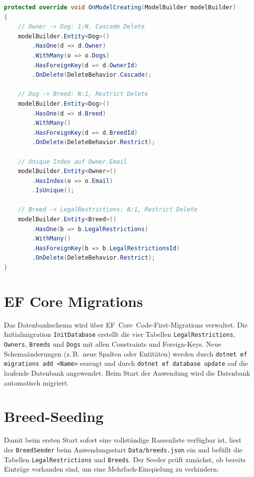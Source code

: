 \begin{lstlisting}[language=csharp, caption={DoggoContext.cs – Beziehungskonfiguration (Auszug)}, label=lst:context, float=htbp]
protected override void OnModelCreating(ModelBuilder modelBuilder)
{
    // Owner -> Dog: 1:N, Cascade Delete
    modelBuilder.Entity<Dog>()
        .HasOne(d => d.Owner)
        .WithMany(o => o.Dogs)
        .HasForeignKey(d => d.OwnerId)
        .OnDelete(DeleteBehavior.Cascade);

    // Dog -> Breed: N:1, Restrict Delete
    modelBuilder.Entity<Dog>()
        .HasOne(d => d.Breed)
        .WithMany()
        .HasForeignKey(d => d.BreedId)
        .OnDelete(DeleteBehavior.Restrict);

    // Unique Index auf Owner.Email
    modelBuilder.Entity<Owner>()
        .HasIndex(o => o.Email)
        .IsUnique();

    // Breed -> LegalRestrictions: N:1, Restrict Delete
    modelBuilder.Entity<Breed>()
        .HasOne(b => b.LegalRestrictions)
        .WithMany()
        .HasForeignKey(b => b.LegalRestrictionsId)
        .OnDelete(DeleteBehavior.Restrict);
}
\end{lstlisting}

\section{EF Core Migrations}
\label{sec:migrations}

Das Datenbankschema wird über EF~Core~Code-First-Migrations verwaltet. Die
Initialmigration \texttt{InitDatabase} erstellt die vier Tabellen \texttt{LegalRestrictions},
\texttt{Owners}, \texttt{Breeds} und \texttt{Dogs} mit allen Constraints und Foreign-Keys.
Neue Schemaänderungen (z.\,B.\ neue Spalten oder Entitäten) werden durch
\texttt{dotnet ef migrations add <Name>} erzeugt und durch \texttt{dotnet ef database update}
auf die laufende Datenbank angewendet. Beim Start der Anwendung wird die Datenbank
automatisch migriert.

\section{Breed-Seeding}
\label{sec:seeding}

Damit beim ersten Start sofort eine vollständige Rassenliste verfügbar ist, liest der
\texttt{BreedSeeder} beim Anwendungsstart \texttt{Data/breeds.json} ein und befüllt die
Tabellen \texttt{LegalRestrictions} und \texttt{Breeds}. Der Seeder prüft zunächst, ob
bereits Einträge vorhanden sind, um eine Mehrfach-Einspielung zu verhindern:

